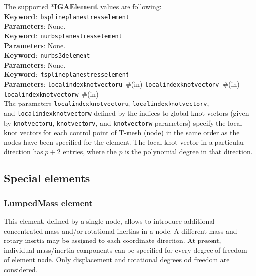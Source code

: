 \documentclass[a4paper]{article}
\newcommand{\descitem}[1]{{\noindent \textbf{#1}}:}
\newcommand{\elemkeyword}[1]{\descitem{Keyword}~\param{#1}} %
\newcommand{\param}[1]{\texttt{#1}} %
\newcommand{\field}[2]{\param{#1}~\#{\tiny(#2)}} %
\newcommand{\entKeyword}[1]{*\textbf{#1}} %
\begin{document}
The supported \entKeyword{IGAElement} values are following:\\
\elemkeyword{bsplineplanestresselement}\\
\descitem{Parameters} None.\\
\elemkeyword{nurbsplanestresselement}\\
\descitem{Parameters} None.\\
\elemkeyword{nurbs3delement}\\
\descitem{Parameters} None.\\
\elemkeyword{tsplineplanestresselement}\\
\descitem{Parameters} \field{localindexknotvectoru}{in} \field{localindexknotvectorv}{in} \field{localindexknotvectorw}{in}\\
The parameters \param{localindexknotvectoru}, \param{localindexknotvectorv},\\ and \param{localindexknotvectorw} defined by the indices to global knot vectors (given by \param{knotvectoru}, \param{knotvectorv}, and \param{knotvectorw} parameters) specify the local knot vectors for each control point of T-mesh (node) in the same order as the nodes have been specified for the element. The local knot vector in a particular direction has $p+2$ entries, where the $p$ is the polynomial degree in that direction.


\clearpage
\subsection{Special elements}
\subsubsection{LumpedMass element}
This element, defined by a single node, allows to introduce additional concentrated mass and/or rotational inertias in a node.
A different mass and rotary inertia may be assigned to each coordinate direction. At present, individual mass/inertia components can be specified for  every degree of freedom of element node. Only displacement and rotational degrees od freedom are considered. 
\end{document}
